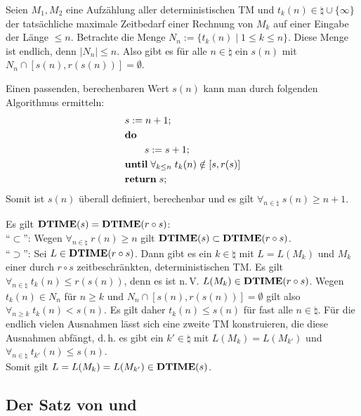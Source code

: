 \begin{Beweis}
    Seien $M_1, M_2$ eine Aufzählung aller deterministischen TM und
    $t_k(n) \in \natural \cup \{\infty\}$ der tatsächliche maximale Zeitbedarf einer Rechnung
    von $M_k$ auf einer Eingabe der Länge $\le n$.
    Betrachte die Menge $N_n := \{t_k(n) \;|\; 1 \le k \le n\}$.
    Diese Menge ist endlich, denn $|N_n| \le n$.
    Also gibt es für alle $n \in \natural$ ein $s(n)$ mit
    $N_n \cap [s(n), r(s(n))] = \emptyset$.
    
    Einen passenden, berechenbaren Wert $s(n)$ kann man durch folgenden Algorithmus ermitteln:
    \begin{align*}&
        s := n + 1;\\&
        \mathbf{do}\;\\&
        \qquad s := s + 1;\\&
        \mathbf{until}\; \forall_{k \le n}\; t_k(n) \notin [s, r(s)]\\&
        \mathbf{return}\; s;
    \end{align*}
    Somit ist $s(n)$ überall definiert, berechenbar und es gilt
    $\forall_{n \in \natural}\; s(n) \ge n + 1$.
    
    Es gilt $\mathbf{DTIME}(s) = \mathbf{DTIME}(r \circ s)$:\\
    "`$\subset$"':
    Wegen $\forall_{n \in \natural}\; r(n) \ge n$ gilt $\mathbf{DTIME}(s) \subset \mathbf{DTIME}(r \circ s)$.\\
    "`$\supset$"':
    Sei $L \in \mathbf{DTIME}(r \circ s)$.
    Dann gibt es ein $k \in \natural$ mit $L = L(M_k)$ und $M_k$ einer durch $r \circ s$
    zeitbeschränkten, deterministischen TM.
    Es gilt $\forall_{n \in \natural}\; t_k(n) \le r(s(n))$, denn es ist n.\,V.
    $L(M_k) \in \mathbf{DTIME}(r \circ s)$.
    Wegen $t_k(n) \in N_n$ für $n \ge k$ und $N_n \cap [s(n), r(s(n))] = \emptyset$ gilt
    also $\forall_{n \ge k}\; t_k(n) < s(n)$.
    Es gilt daher $t_k(n) \le s(n)$ für fast alle $n \in \natural$.
    Für die endlich vielen Ausnahmen lässt sich eine zweite TM konstruieren, die diese
    Ausnahmen abfängt, d.\,h. es gibt ein $k' \in \natural$ mit $L(M_k) = L(M_{k'})$ und
    $\forall_{n \in \natural}\; t_{k'}(n) \le s(n)$.\\
    Somit gilt $L = L(M_k) = L(M_{k'}) \in \mathbf{DTIME}(s)$.
\end{Beweis}

\subsection{%
    Der Satz von  und %
}

